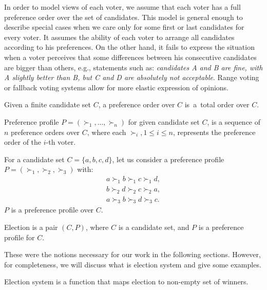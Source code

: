 In order to model views of each voter,
we assume that each voter has a full preference order over the set of candidates.
This model is general enough to describe special cases
when we care only for some first or last candidates for every voter.
It assumes the ability of each voter to arrange all candidates according to his preferences.
On the other hand, it fails to express the situation when a voter perceives that some differences
between his consecutive candidates are bigger than others, e.g., statements such as:
\textit{candidates A and B are fine, with A slightly better than B, but C and D are absolutely not acceptable}.
Range voting \cite{rangevoting} or fallback voting \cite{fallbackvoting} systems
allow for more elastic expression of opinions.

\begin{defn}
Given a finite candidate set $C$, a preference order over $C$
is~a~total order over $C$.
\end{defn}

\begin{defn}
Preference profile $P = (\succ_1, ... , \succ_n)$ for given candidate set $C$,
is a sequence of $n$ preference orders over $C$,
where each $\succ_i, 1 \leq i \leq n$, represents the preference order of the $i$-th voter.
\end{defn}

\begin{exmp} \label{example-election}
For a candidate set $C = \{a, b, c, d\}$,
let us consider a preference profile $P = (\succ_1, \succ_2, \succ_3)$ with:
\begin{align*}
a \succ_1 b \succ_1 c \succ_1 d, \\
b \succ_2 d \succ_2 c \succ_2 a,	\\
a \succ_3 b \succ_3 d \succ_3 c.
\end{align*}
$P$ is a preference profile over $C$.
\end{exmp}


\begin{defn}[election]
Election is a pair $(C, P)$, where $C$ is a candidate set, and $P$ is a preference profile for $C$.
\end{defn}

These were the notions necessary for our work in the following sections.
However, for completeness, we will discuss what is election system and give some examples.

\begin{defn}
Election system is a function that maps election to non-empty set of winners.
\end{defn}

